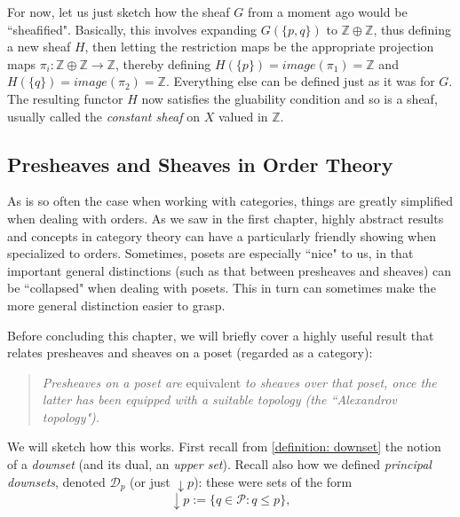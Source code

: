 \documentclass[a4paper]{book}
\theoremstyle{definition}
\theoremstyle{definition}
\theoremstyle{definition}
\theoremstyle{theorem}
\theoremstyle{definition}
\begin{document}
For now, let us just sketch how the sheaf $G$ from a moment ago would be ``sheafified". Basically, this involves expanding $G(\{p,q\})$ to $\mathbb{Z} \oplus \mathbb{Z}$, thus defining a new sheaf $H$, then letting the restriction maps be the appropriate projection maps $\pi_i: \mathbb{Z} \oplus \mathbb{Z} \rightarrow \mathbb{Z}$, thereby defining $H(\{p\}) = image(\pi_1) = \mathbb{Z}$ and $H(\{q\}) = image(\pi_2) = \mathbb{Z}$. Everything else can be defined just as it was for $G$. The resulting functor $H$ now satisfies the gluability condition and so is a sheaf, usually called the \textit{constant sheaf} on $X$ valued in $\mathbb{Z}$.  
\subsection{Presheaves and Sheaves in Order Theory}
As is so often the case when working with categories, things are greatly simplified when dealing with orders. As we saw in the first chapter, highly abstract results and concepts in category theory can have a particularly friendly showing when specialized to orders. Sometimes, posets are especially ``nice" to us, in that important general distinctions (such as that between presheaves and sheaves) can be ``collapsed" when dealing with posets. This in turn can sometimes make the more general distinction easier to grasp. \par 
Before concluding this chapter, we will briefly cover a highly useful result that relates presheaves and sheaves on a poset (regarded as a category):  
\begin{quote}
	\textit{Presheaves on a poset are} equivalent \textit{to sheaves over that poset, once the latter has been equipped with a suitable topology (the ``Alexandrov topology").} 
\end{quote}
We will sketch how this works. First recall from \ref{definition: downset} the notion of a \textit{downset} (and its dual, an \textit{upper set}). Recall also how we defined \textit{principal downsets}, denoted $\mathcal{D}_p$ (or just $\downarrow p$): these were sets of the form 
\begin{equation*}
\downarrow p := \{q \in \mathcal{P}: q \leq p \},  
\end{equation*}
\end{document}
